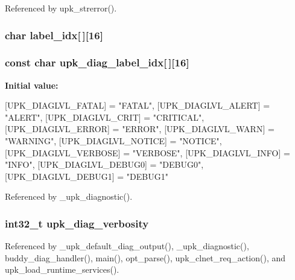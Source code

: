 Referenced by upk\_\-strerror().

\subsubsection[{label\_\-idx}]{\setlength{\rightskip}{0pt plus 5cm}char {\bf label\_\-idx}[$\,$][16]}\label{group__upk__errors_ga9d2bce202c2ba97f9c8c02d46857552a}
\subsubsection[{upk\_\-diag\_\-label\_\-idx}]{\setlength{\rightskip}{0pt plus 5cm}const char {\bf upk\_\-diag\_\-label\_\-idx}[$\,$][16]\hspace{0.3cm}{\ttfamily  [static]}}\label{group__upk__errors_gae422812b612ba3ecf5f411f023416c38}
{\bfseries Initial value:}
\begin{DoxyCode}
 {
    [UPK_DIAGLVL_FATAL] = "FATAL",
    [UPK_DIAGLVL_ALERT] = "ALERT",
    [UPK_DIAGLVL_CRIT] = "CRITICAL",
    [UPK_DIAGLVL_ERROR] = "ERROR",
    [UPK_DIAGLVL_WARN] = "WARNING",
    [UPK_DIAGLVL_NOTICE] = "NOTICE",
    [UPK_DIAGLVL_VERBOSE] = "VERBOSE",
    [UPK_DIAGLVL_INFO] = "INFO",
    [UPK_DIAGLVL_DEBUG0] = "DEBUG0",
    [UPK_DIAGLVL_DEBUG1] = "DEBUG1"
}
\end{DoxyCode}


Referenced by \_\-upk\_\-diagnostic().

\subsubsection[{upk\_\-diag\_\-verbosity}]{\setlength{\rightskip}{0pt plus 5cm}int32\_\-t {\bf upk\_\-diag\_\-verbosity}}\label{group__upk__errors_gad9883b6b44bf3fa3e1abac4266ca1b65}


Referenced by \_\-upk\_\-default\_\-diag\_\-output(), \_\-upk\_\-diagnostic(), buddy\_\-diag\_\-handler(), main(), opt\_\-parse(), upk\_\-clnet\_\-req\_\-action(), and upk\_\-load\_\-runtime\_\-services().


